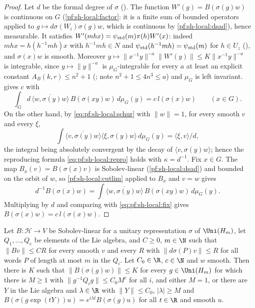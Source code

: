 \begin{proof}
Let $d$ be the formal degree of $\sigma$ (). The
function $W'(g)=B(\sigma(g)w)$ is continuous on $G$
(\cref{pf:sh-local:factor}: it is a finite sum of bounded operators applied to $g\mapsto d\sigma(W_i)\sigma(g)w$,
which is continuous by \cref{pf:sh-local:dsad}), hence measurable. It satisfies
$W'(mhx)=\psi_{\mathrm{std}}(m)\pi(h)W'(x)$: indeed $mhx=h(h^{-1}mh)x$ with $h^{-1}mh\in N$ and
$\psi_{\mathrm{std}}(h^{-1}mh)=\psi_{\mathrm{std}}(m)$ for $h\in U_z$
(), and $\sigma(x)w$ is smooth.
Moreover $y\mapsto\|x^{-1}y\|^{-a}\|W'(y)\|\le K\|x^{-1}y\|^{-a}$ is integrable, since $y\mapsto\|y\|^{-a}$ is
$\mu_G$-integrable for every $a$ at least an explicit constant $A_B(k,r)\le n^2+1$
(; note $n^2+1\le4n^3\le a$) and
$\mu_G$ is left invariant.  gives $c$ with
\begin{equation}\label{eq:pf:sh-local:fix}
\int_G d\,\overline{\langle w,\sigma(y)w\rangle}\,B(\sigma(xy)w)\,d\mu_G(y)=c\,l(\sigma(x)w)\qquad(x\in G).
\end{equation}
On the other hand, by \eqref{eq:pf:sh-local:schur} with $\|w\|=1$, for every smooth $v$ and every $\xi$,
\[
\int\overline{\langle v,\sigma(y)w\rangle}\langle\xi,\sigma(y)w\rangle\,d\mu_G(y)=\langle\xi,v\rangle/d,
\]
the integral being absolutely convergent by the decay of $\langle v,\sigma(y)w\rangle$; hence the reproducing formula
\eqref{eq:pf:sh-local:repro} holds with $\kappa=d^{-1}$. Fix $x\in G$. The map $B_x(v)=B(\sigma(x)v)$ is
Sobolev-linear (\cref{pf:sh-local:dsad}) and bounded on the orbit of $w$, so \cref{pf:sh-local:cutlim} applied to
$B_x$ and $v=w$ gives
\[
d^{-1}B(\sigma(x)w)=\int\overline{\langle w,\sigma(y)w\rangle}\,B(\sigma(xy)w)\,d\mu_G(y).
\]
Multiplying by $d$ and comparing with \eqref{eq:pf:sh-local:fix} gives $B(\sigma(x)w)=c\,l(\sigma(x)w)$.
\end{proof}

\begin{lemma}\label{pf:sh-local:absbound}
Let $B:\mathcal H\to V$ be Sobolev-linear for a unitary representation $\sigma$ of $\Uni(H_m)$, let
$Q_1,\dots,Q_e$ be elements of the Lie algebra, and $C\ge0$, $m\in\N$ such that $\|Bv\|\le CR$ for every smooth $v$
and every $R$ with $\|d\sigma(P)v\|\le R$ for all words $P$ of length at most $m$ in the $Q_i$. Let $C_0\in\R$,
$c\in\N$ and $w$ smooth. Then there is $K$ such that $\|B(\sigma(g)w)\|\le K$ for every $g\in\Uni(H_m)$ for which
there is $M\ge1$ with $\|g^{-1}Q_ig\|\le C_0M^c$ for all $i$, and either $M=1$, or there are $Y$ in the Lie algebra and
$\lambda\in\R$ with $\|Y\|\le C_0$, $|\lambda|\ge M$ and $B(\sigma(g\exp(tY))u)=e^{i\lambda t}B(\sigma(g)u)$ for all
$t\in\R$ and smooth $u$.
\end{lemma}

